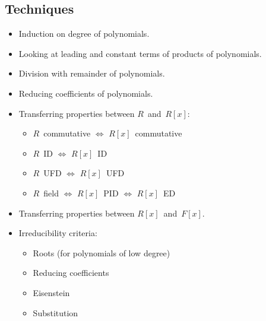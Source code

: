 \subsection*{Techniques}
\begin{itemize}[itemsep=0pt]
\item Induction on degree of polynomials.
\item Looking at leading and constant terms of products of polynomials.
\item Division with remainder of polynomials.
\item Reducing coefficients of polynomials.
\item Transferring properties between \(R\)~and~\(R[x]\):
\begin{itemize}[itemsep=0pt]
\item \(R\)~commutative \(\iff\) \(R[x]\)~commutative
\item \(R\)~ID \(\iff\) \(R[x]\)~ID
\item \(R\)~UFD \(\iff\) \(R[x]\)~UFD
\item \(R\)~field \(\iff\) \(R[x]\)~PID \(\iff\) \(R[x]\)~ED
\end{itemize}
\item Transferring properties between \(R[x]\)~and~\(F[x]\).
\item Irreducibility criteria:
\begin{itemize}[itemsep=0pt]
\item Roots (for polynomials of low degree)
\item Reducing coefficients
\item Eisenstein
\item Substitution
\end{itemize}
\end{itemize}
